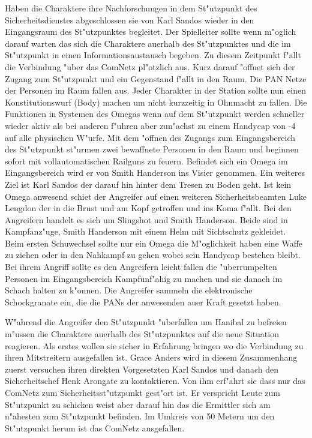 
Haben die Charaktere ihre Nachforschungen in dem St"utzpunkt des Sicherheitsdienstes abgeschlossen sie von Karl Sandos wieder in den Eingangsraum des St"utzpunktes begleitet. Der Spielleiter sollte wenn m"oglich darauf warten das sich die Charaktere au\3erhalb des St"utzpunktes und die im St"utzpunkt in einen Informationsaustausch begeben. Zu diesem Zeitpunkt f"allt die Verbindung "uber das ComNetz pl"otzlich aus. Kurz darauf "offnet sich der Zugang zum St"utzpunkt und ein Gegenstand f"allt in den Raum. Die PAN Netze der Personen im Raum fallen aus. Jeder Charakter in der Station sollte nun einen Konstitutionswurf (Body) machen um nicht kurzzeitig in Ohnmacht zu fallen. Die Funktionen in Systemen des Omegas wenn auf dem St"utzpunkt werden schneller wieder aktiv als bei anderen f"uhren aber zun"achst zu einem Handycap von -4 auf alle physischen W"urfe. Mit dem "offnen des Zugangs zum Eingangsbereich des St"utzpunkt st"urmen zwei bewaffnete Personen in den Raum und beginnen sofort mit vollautomatischen Railguns zu feuern. Befindet sich ein Omega im Eingangsbereich wird er von
Smith Handerson ins Visier genommen. Ein weiteres Ziel ist Karl Sandos der darauf hin hinter dem Tresen zu Boden geht. Ist kein Omega anwesend schie\3t der Angreifer auf einen weiteren Sicherheitsbeamten Luke Lengdon der in die Brust und am Kopf getroffen und ins Koma f"allt. Bei den Angreifern handelt es sich um Slingshot und Smith Handerson. Beide sind in Kampfanz"uge, Smith Handerson mit einem Helm mit Sichtschutz gekleidet. Beim ersten Schu\3wechsel sollte nur ein Omega die M"oglichkeit haben eine Waffe zu ziehen oder in den Nahkampf zu gehen wobei sein Handycap bestehen bleibt. Bei ihrem Angriff sollte es den Angreifern leicht fallen die "uberrumpelten Personen im Eingangsbereich Kampfunf"ahig zu machen und sie danach im Schach halten zu k"onnen. Die Angreifer sammeln die elektronische Schockgranate ein, die die PANs der anwesenden au\3er Kraft gesetzt haben.

W"ahrend die Angreifer den St"utzpunkt "uberfallen um Hanibal zu befreien m"ussen die Charaktere au\3erhalb des St"utzpunktes auf die neue Situation reagieren. Als erstes wollen sie sicher in Erfahrung bringen wo die Verbindung zu ihren Mitstreitern ausgefallen ist. Grace Anders wird in diesem Zusammenhang zuerst versuchen ihren direkten Vorgesetzten Karl Sandos und danach den Sicherheitschef Henk Arongate zu kontaktieren. Von ihm erf"ahrt sie dass nur das ComNetz zum Sicherheitsst"utzpunkt gest"ort ist. Er verspricht Leute zum St"utzpunkt zu schicken weist aber darauf hin das die Ermittler sich am n"ahesten zum St"utzpunkt befinden. Im Umkreis von 50 Metern um den St"utzpunkt herum ist das ComNetz ausgefallen. 


